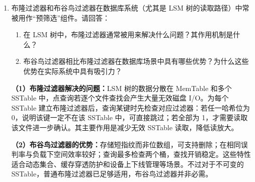 \documentclass[UTF8,a4paper,11pt]{ctexart}
\newenvironment{answer}%
  {\begin{ans}\noindent{\bfseries\color{ansframe}【答案】}\hspace{0.4em}}%
  {\end{ans}}
\begin{document}
\begin{enumerate}
\begin{enumerate}
\item 写入 $(2,b')$ 后，键 2 存在两个版本（$b$ 和 $b'$）。在读取键 2 时，引擎如何确定应返回哪个版本？请说明读取路径中“版本判定”的依据。
\begin{answer}
读取键 2 时，按“由新到旧”的顺序检查：MemTable（空）$\rightarrow$ Immutable MemTable（无）$\rightarrow$ L0 中较新的 SSTable 2 $\rightarrow$ 较旧的 SSTable 1。\par
SSTable 2 中存在 $(2,b')$，其写入序列号/时间戳晚于 SSTable 1 中的 $(2,b)$，因此以最新版本为准。\par
返回 $(2,b')$。
\end{answer}

\item 若压缩策略改为“仅在 L0 达到 4 个 SSTable 时合并”，对读放大和写放大分别有何影响？
\begin{answer}
\textbf{读放大增大：}L0 中可积累更多 SSTable，点查需检查更多文件；虽有布隆过滤器可减少部分无效 I/O，但最坏情况仍需多次查找。\par
\textbf{写放大降低：}合并触发频率下降，数据被重复重写的次数减少。\par
代价是空间放大可能增加，因为旧版本与冗余数据保留更久。总体上是以读放大和空间放大换取写放大降低。
\end{answer}
\end{enumerate}

\item 布隆过滤器和布谷鸟过滤器在数据库系统（尤其是 LSM 树的读取路径）中常被用作“预筛选”组件。请回答：
\begin{enumerate}
\item 在 LSM 树中，布隆过滤器通常被用来解决什么问题？其作用机制是什么？
\item 布谷鸟过滤器相比布隆过滤器在数据库场景中具有哪些优势？为什么这些优势在实际系统中具有吸引力？
\end{enumerate}
\begin{answer}
\textbf{（1）布隆过滤器解决的问题：}LSM 树的数据分散在 MemTable 和多个 SSTable 中，点查询若逐个文件查找会产生大量无效磁盘 I/O。为每个 SSTable 建立布隆过滤器后，查询某键时先检查对应过滤器：若任一哈希位为 0，说明该键一定不在该 SSTable 中，可直接跳过；若全部为 1，才需要读取该文件进一步确认。其主要作用是减少无效 SSTable 读取，降低读放大。\par
\textbf{（2）布谷鸟过滤器的优势：}存储短指纹而非位数组，可支持删除；在相同误判率与负载下空间效率较好；查询最多检查两个桶，查找开销稳定。这些特性适合动态集合、缓存穿透防护和设备上下线管理等场景。不过对于不可变的 SSTable，普通布隆过滤器已足够适用，布谷鸟过滤器并非必需。
\end{answer}


\end{enumerate}
\end{document}
